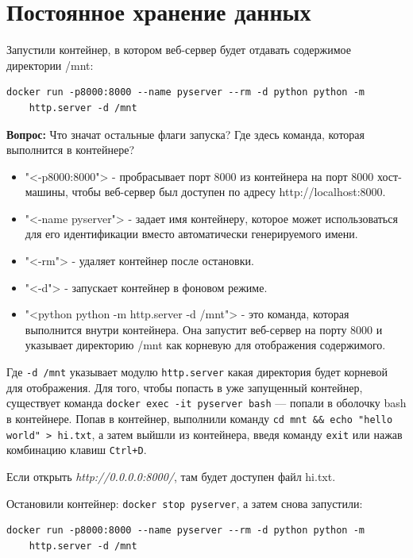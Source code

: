 \section{Постоянное хранение данных}
Запустили контейнер, в котором веб-сервер будет отдавать
содержимое директории /mnt:

\begin{verbatim}
docker run -p8000:8000 --name pyserver --rm -d python python -m
	http.server -d /mnt
\end{verbatim}

\textbf{Вопрос:} Что значат остальные флаги запуска? Где здесь команда,
которая выполнится в контейнере?\par

\begin{itemize}
	\item "<-p8000:8000"> - пробрасывает порт 8000 из контейнера на порт
		8000 хост-машины, чтобы веб-сервер был доступен по адресу
		http://localhost:8000.
	\item "<-name pyserver"> - задает имя контейнеру, которое может
		использоваться для его идентификации вместо автоматически
		генерируемого имени.
	\item "<-rm"> - удаляет контейнер после остановки.
	\item "<-d"> - запускает контейнер в фоновом режиме.
	\item "<python python -m http.server -d /mnt"> - это команда,
		которая выполнится внутри контейнера. Она запустит веб-сервер
		на порту 8000 и указывает директорию /mnt как корневую
		для отображения содержимого.
\end{itemize}

Где \texttt{-d /mnt} указывает модулю
\texttt{http.server} какая директория будет корневой для отображения.
Для того, чтобы попасть в уже запущенный контейнер,
существует команда \texttt{docker exec -it pyserver bash} --- попали
в оболочку bash в контейнере. Попав в контейнер, выполнили команду
\verb|cd mnt && echo "hello world" > hi.txt|, а затем выйшли из контейнера,
введя команду \texttt{exit} или нажав комбинацию клавиш \texttt{Ctrl+D}.\par
Если открыть \textit{http://0.0.0.0:8000/},
там будет доступен файл hi.txt.\par
Остановили контейнер: \texttt{docker stop pyserver}, а затем снова запустили:

\begin{verbatim}
docker run -p8000:8000 --name pyserver --rm -d python python -m
	http.server -d /mnt
\end{verbatim}

